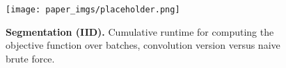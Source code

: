 \begin{figure}[h]
\centering
\texttt{[image: paper\_imgs/placeholder.png]}
\caption{\textbf{Segmentation (IID).} Cumulative runtime for computing the objective function over batches, convolution version versus naive brute force.}
\end{figure}